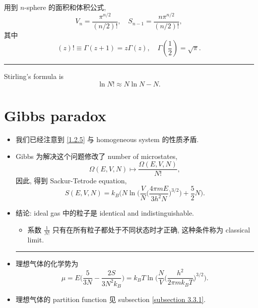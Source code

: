 \begin{itemize}
	\begin{tcolorbox}[title=calculation:]
		用到 $n$-sphere 的面积和体积公式,
		\begin{equation}
			V_n = \frac{\pi^{n / 2}}{(n / 2)!}, \quad S_{n - 1} = \frac{n \pi^{n / 2}}{(n / 2)!},
		\end{equation}
		其中
		\begin{equation}
			(z)! \equiv \Gamma(z + 1) = z \Gamma(z), \quad \Gamma(\frac{1}{2}) = \sqrt{\pi}.
		\end{equation}
		
		\noindent\rule[0.5ex]{\linewidth}{0.5pt} %
		
		Stirling's formula is
		\begin{equation}
			\ln N! \approx N \ln N - N.
		\end{equation}
	\end{tcolorbox}
\end{itemize}

\section{Gibbs paradox}
\begin{itemize}
	\item 我们已经注意到 \eqref{1.2.5} 与 homogeneous system 的性质矛盾.
	
	\item Gibbs 为解决这个问题修改了 number of microstates,
	\begin{equation}
		\Omega(E, V, N) \mapsto \frac{\Omega(E, V, N)}{N!},
	\end{equation}
	因此, 得到 Sackur-Tetrode equation,
	\begin{equation}
		S(E, V, N) = k_B \bigg( N \ln \bigg( \frac{V}{N} \Big( \frac{4 \pi m E}{3 h^2 N} \Big)^{3 / 2} \bigg) + \frac{5}{2} N \bigg).
	\end{equation}
	
	\item 结论: ideal gas 中的粒子是 identical and indistinguishable.
	\begin{itemize}
		\item 系数 $\frac{1}{N!}$ 只有在所有粒子都处于不同状态时才正确, 这种条件称为 classical limit.
	\end{itemize}
	
	\noindent\rule[0.5ex]{\linewidth}{0.5pt} %
	
	\item 理想气体的化学势为
	\begin{equation}
		\mu = E \Big( \frac{5}{3 N} - \frac{2 S}{3 N^2 k_B} \Big) = k_B T \ln \Big( \frac{N}{V} \Big( \frac{h^2}{2 \pi m k_B T} \Big)^{3 / 2} \Big).
	\end{equation}
	
	\item 理想气体的 partition function 见 subsection \ref{subsection 3.3.1}.
\end{itemize}
